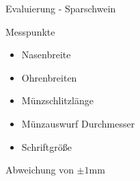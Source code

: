 \documentclass[11pt]{beamer}
\begin{document}
\begin{frame}{Evaluierung - Sparschwein}
	\begin{block}{Messpunkte}
		\begin{itemize}
			\item Nasenbreite
			\item Ohrenbreiten
			\item Münzschlitzlänge
			\item Münzauswurf Durchmesser
			\item Schriftgröße
		\end{itemize}
	\end{block}
	\begin{block}{}
		Abweichung von $\pm1$mm
	\end{block}
\end{frame}
\end{document}

